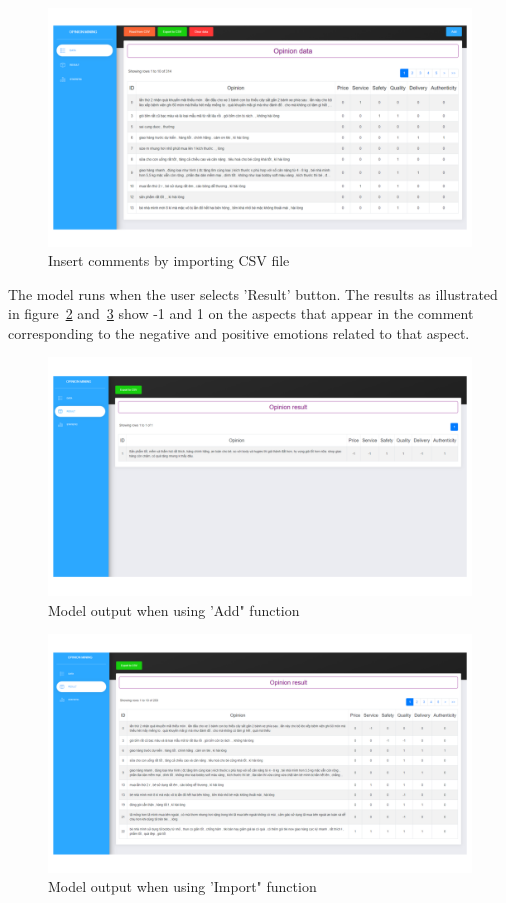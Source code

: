 \begin{figure}[h]
	\centering
	\includegraphics[width=\linewidth]{Chapter4/Figs/tool2.png}
	\caption{Insert comments by importing CSV file}
	\label{fig:tool2}
\end{figure}

The model runs when the user selects 'Result' button. The results as illustrated in figure~\ref{fig:tool3} and~\ref{fig:tool4} show -1 and 1 on the aspects that appear in the comment corresponding to the negative and positive emotions related to that aspect.

\begin{figure}[h]
	\centering
	\includegraphics[width=\linewidth]{Chapter4/Figs/tool3.png}
	\caption{Model output when using 'Add" function}
	\label{fig:tool3}
\end{figure}

\begin{figure}[h]
	\centering
	\includegraphics[width=\linewidth]{Chapter4/Figs/tool4.png}
	\caption{Model output when using 'Import" function}
	\label{fig:tool4}
\end{figure}

